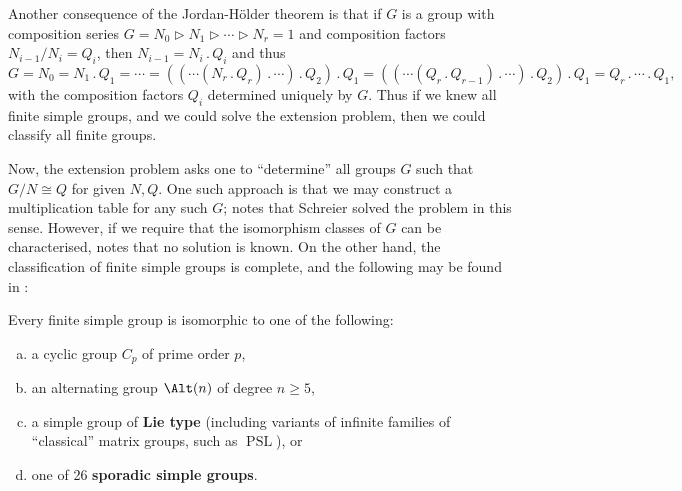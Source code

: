 Another consequence of the Jordan-H\"older theorem is that if $G$ is a group with composition series $G = N_0 \rhd N_1 \rhd \dotsb \rhd N_r = 1$ and composition factors $N_{i-1}/N_i = Q_i$, then $N_{i-1} = N_i \mathrel{.} Q_i$ and thus
$$G = N_0 = N_1 \mathrel{.} Q_1 = \dotsb = ((\dotsb(N_r \mathrel{.} Q_r)\mathrel{.}\dotsb )\mathrel{.} Q_2)\mathrel{.} Q_1 = ((\dotsb(Q_r \mathrel{.} Q_{r-1})\mathrel{.} \dotsb)\mathrel{.} Q_2)\mathrel{.} Q_1 = Q_r \mathrel{.} \dotsb \mathrel{.} Q_1,$$
with the composition factors $Q_i$ determined uniquely by $G$. Thus if we knew all finite simple groups, and we could solve the extension problem, then we could classify all finite groups.

Now, the extension problem asks one to ``determine'' all groups $G$ such that $G/N \cong Q$ for given $N,Q$. One such approach is that we may construct a multiplication table for any such $G$; \cite{rotman_intro_theory_groups1995} notes that Schreier solved the problem in this sense. However, if we require that the isomorphism classes of $G$ can be characterised, \cite{rotman_intro_theory_groups1995} notes that no solution is known. On the other hand, the classification of finite simple groups is complete, and the following may be found in \cite{solomon2018}:

\begin{theorem}\label{thm:cfsg}
    Every finite simple group is isomorphic to one of the following:
    \begin{enumerate}[(a)]
        \item a cyclic group $C_p$ of prime order $p$,
        \item an alternating group $\Alt(n)$ of degree $n \geq 5$,
        \item a simple group of \textbf{Lie type} (including variants of infinite families of ``classical'' matrix groups, such as $\operatorname{PSL}$), or
        \item one of 26 \textbf{sporadic simple groups}.
    \end{enumerate}
\end{theorem}

